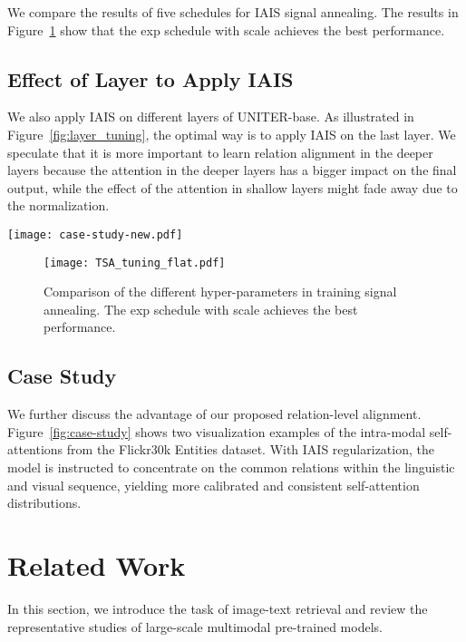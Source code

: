 \documentclass[11pt,a4paper]{article}
\begin{document}
We compare the results of five schedules for IAIS signal annealing. 
The results in Figure~\ref{fig:tsa-tuning} show that the exp schedule with scale  achieves the best performance.
\subsection{Effect of Layer to Apply IAIS}
We also apply IAIS on different layers of UNITER-base. 
As illustrated in Figure~\ref{fig:layer_tuning}, the optimal way is to apply IAIS on the last layer.
We speculate that it is more important to learn relation alignment in the deeper layers because the attention in the deeper layers has a bigger impact on the final output, while the effect of the attention in shallow layers might fade away due to the normalization.

\begin{figure*}[t!]
    \centering
    \texttt{[image: case-study-new.pdf]}
    \caption{Visualization of intra-modal self-attentions with and without our IAIS method.}
    \label{fig:case-study}
\end{figure*}

\begin{figure}[t!]
    \centering
    \texttt{[image: TSA\_tuning\_flat.pdf]}
    \caption{Comparison of the different hyper-parameters in training signal annealing. The exp schedule with scale  achieves the best performance.}
    \label{fig:tsa-tuning}
\end{figure}

\subsection{Case Study}
We further discuss the advantage of our proposed relation-level alignment. 
Figure~\ref{fig:case-study} shows two visualization examples of the intra-modal self-attentions from the Flickr30k Entities dataset. 
With IAIS regularization, the model is instructed to concentrate on the common relations within the linguistic and visual sequence, yielding more calibrated and consistent self-attention distributions. 

\section{Related Work}
In this section, we introduce the task of image-text retrieval and review the representative studies of large-scale multimodal pre-trained models.
\end{document}
